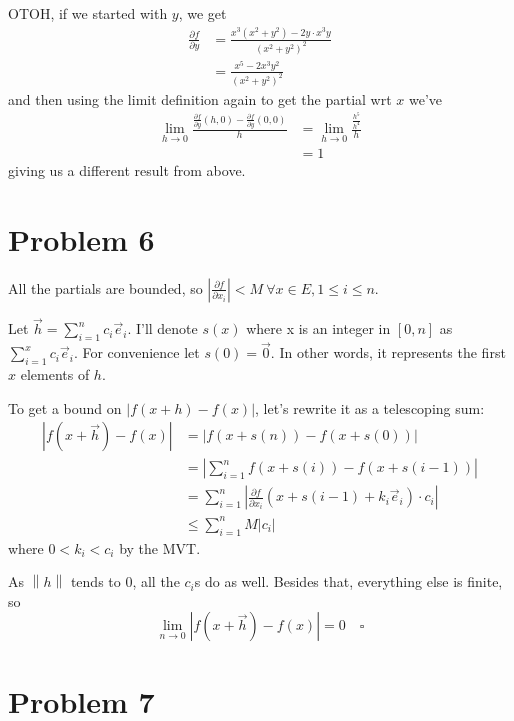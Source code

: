 \documentclass[12pt]{article}
\newcommand{\norm}[1]{\left\lVert#1\right\rVert}
\begin{document}
OTOH, if we started with $y$, we get
\begin{align*}
  \frac{\partial f}{\partial y}
   & = \frac{x^3\left(x^2+y^2\right)-2y \cdot x^3y}{\left(x^2+y^2\right)^2} \\
   & = \frac{x^5-2x^3y^2}{\left(x^2+y^2\right)^2}
\end{align*}
and then using the limit definition again to get the partial wrt $x$ we've
\begin{align*}
  \lim_{h \to 0} \frac{\frac{\partial f}{\partial y}(h, 0)-\frac{\partial f}{\partial y}(0, 0)}{h}
   & = \lim_{h \to 0} \frac{\frac{h^5}{h^4}}{h} \\
   & = 1
\end{align*}
giving us a different result from above.

\pagebreak

\section{Problem 6}

All the partials are bounded, so
$\left|\frac{\partial f}{\partial x_i}\right| < M\ \forall x \in E, 1 \le i \le n$.

Let $\vec{h}=\sum_{i=1}^{n} c_i\vec{e}_i$.
I'll denote $s(x)$ where x is an integer in $[0, n]$ as $\sum_{i=1}^{x} c_i\vec{e}_i$.
For convenience let $s(0)=\vec{0}$.
In other words, it represents the first $x$ elements of $h$.

To get a bound on $|f(x+h)-f(x)|$, let's rewrite it as a telescoping sum:
\begin{align*}
  |f(x+\vec{h})-f(x)|
   & = |f(x+s(n))-f(x+s(0))|                                                                        \\
   & = \left|\sum_{i=1}^{n} f(x+s(i))-f(x+s(i-1))\right|                                            \\
   & = \sum_{i=1}^{n} \left|\frac{\partial f}{\partial x_i}(x+s(i-1)+k_i\vec{e}_i) \cdot c_i\right| \\
   & \le \sum_{i=1}^{n} M|c_i|
\end{align*}
where $0 < k_i < c_i$ by the MVT.

As $\norm{h}$ tends to $0$, all the $c_i$s do as well.
Besides that, everything else is finite, so
\[\lim_{n \to 0} |f(x+\vec{h})-f(x)| = 0\quad\square\]

\pagebreak

\section{Problem 7}
\end{document}
